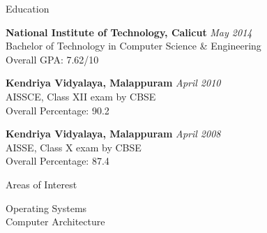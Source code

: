 \documentclass{resume} %
\begin{document}

\begin{rSection}{Education}

{\bf National Institute of Technology, Calicut} \hfill {\em May 2014} \\ 
Bachelor of Technology in Computer Science \& Engineering \\
Overall GPA: 7.62/10

{\bf Kendriya Vidyalaya, Malappuram} \hfill {\em April 2010} \\ 
AISSCE, Class XII exam by CBSE \\
Overall Percentage: 90.2

{\bf Kendriya Vidyalaya, Malappuram} \hfill {\em April 2008} \\ 
AISSE, Class X exam by CBSE \\
Overall Percentage: 87.4
\end{rSection}






\begin{rSection}{Areas of Interest}

{Operating Systems} \\
{Computer Architecture}

\end{rSection}

\end{document}
